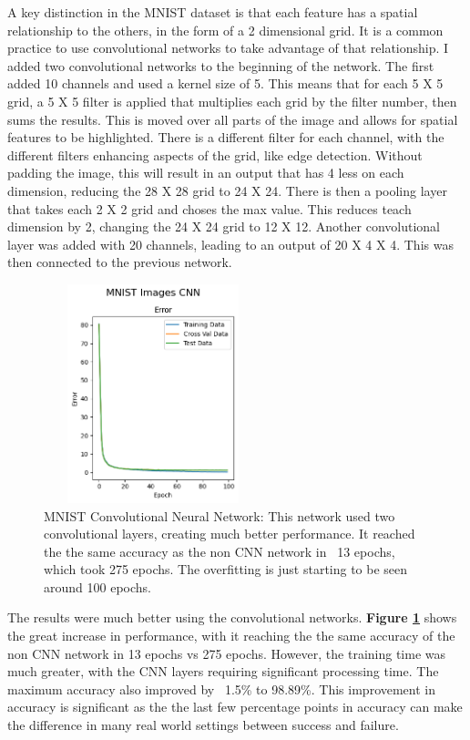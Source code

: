 \documentclass[letterpaper]{article} %
\begin{document}
A key distinction in the MNIST dataset is that each feature has a spatial relationship to the others, in the form of a 2 dimensional grid.  It is a common practice to use convolutional networks to take advantage of that relationship.  I added two convolutional networks to the beginning of the network.  The first added 10 channels and used a kernel size of 5.  This means that for each 5 X 5 grid, a 5 X 5 filter is applied that multiplies each grid by the filter number, then sums the results.  This is moved over all parts of the image and allows for spatial features to be highlighted.  There is a different filter for each channel, with the different filters enhancing aspects of the grid, like edge detection.  Without padding the image, this will result in an output that has 4 less on each dimension, reducing the 28 X 28 grid to 24 X 24.   There is then a pooling layer that takes each 2 X 2 grid and choses the max value.  This reduces teach dimension by 2, changing the 24 X 24 grid to 12 X 12.  Another convolutional layer was added with 20 channels, leading to an output of 20 X 4 X 4.  This was then connected to the previous network.

\begin{figure}[h]
\centering
\includegraphics[width=2.5in, height=2.5in]{figures/MNIST_Images_CNN_Error_MNIST.png}
\caption{MNIST Convolutional Neural Network:  This network used two convolutional layers, creating much better performance.  It reached the the same accuracy as the non CNN network in ~13 epochs, which took 275 epochs.  The overfitting is just starting to be seen around 100 epochs. }
\label{fig:MNIST_Error_MNIST_cnn}
\end{figure}

The results were much better using the convolutional networks.  \textbf{Figure \ref{fig:MNIST_Error_MNIST_cnn}} shows the great increase in performance, with it reaching the the same accuracy of the non CNN network in 13 epochs vs 275 epochs.  However, the training time was much greater, with the CNN layers requiring significant processing time. The maximum accuracy also improved by ~1.5\% to 98.89\%.  This improvement in accuracy is significant as the the last few percentage points in accuracy can make the difference in many real world settings between success and failure. 
\end{document}
